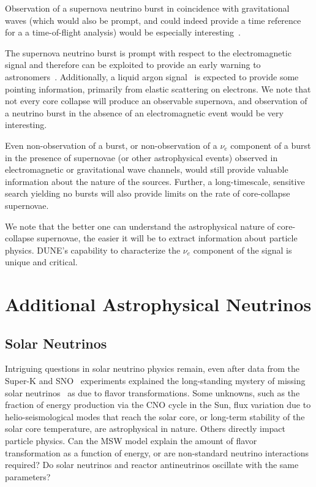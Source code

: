Observation of a supernova neutrino burst in coincidence with gravitational waves (which would also be prompt, and could indeed provide a time reference for a a time-of-flight analysis) would be especially interesting~\cite{Arnaud:2003zr,Ott:2012jq, Mueller:2012sv, Nishizawa:2014zna}.

The supernova neutrino burst is prompt with respect to the
electromagnetic signal and therefore can be exploited to provide an
early warning to astronomers~\cite{Antonioli:2004zb,Scholberg:2008fa}.  
Additionally, a liquid argon signal~\cite{Bueno:2003ei} is expected to
provide some pointing information, primarily from elastic scattering
on electrons.
We note that not every core collapse will produce an observable supernova, and observation of a neutrino burst in the absence of an electromagnetic event would be very interesting. 

Even non-observation of a burst, or non-observation of
a $\nu_e$ component of a burst in the presence of supernovae (or other
astrophysical events) observed in electromagnetic or gravitational
wave channels, would still provide valuable information about the
nature of the sources.  Further, a long-timescale, sensitive search
yielding no bursts will also provide limits on the rate of
core-collapse supernovae.

We note that the better one can understand the astrophysical nature of core-collapse supernovae, the easier it will be to extract information about particle physics.  DUNE's capability to characterize the $\nu_e$ component of the signal is unique and critical.



\section{Additional Astrophysical Neutrinos}
\label{sec:physics-snblowe-other}

\subsection{Solar Neutrinos}

Intriguing questions in solar neutrino physics remain,
even after data
from the Super-K and SNO~\cite{Fukuda:2001nj,Ahmad:2001an}
experiments explained the long-standing mystery of missing solar
neutrinos~\cite{Cleveland:1998nv} as due to flavor
transformations. 
Some unknowns, such as the fraction of energy production via the CNO
cycle in the Sun, flux variation due to helio-seismological modes that
reach the solar core, or long-term stability of the solar core
temperature, are astrophysical in nature. Others directly impact
particle physics. Can the MSW model explain the amount of flavor
transformation as a function of energy, or are non-standard neutrino
interactions required?  Do solar neutrinos and reactor antineutrinos
oscillate with the same parameters? 

